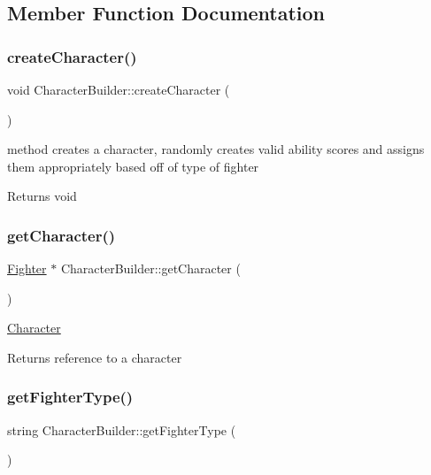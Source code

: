 \subsection{Member Function Documentation}
\hypertarget{class_character_builder_a3565d9c329c959aa340d7c0ebf30e613}{}\label{class_character_builder_a3565d9c329c959aa340d7c0ebf30e613} 
\subsubsection{\texorpdfstring{create\+Character()}{createCharacter()}}
{\footnotesize\ttfamily void Character\+Builder\+::create\+Character (\begin{DoxyParamCaption}{ }\end{DoxyParamCaption})}

method creates a character, randomly creates valid ability scores and assigns them appropriately based off of type of fighter \begin{DoxyReturn}{Returns}
void 
\end{DoxyReturn}
\hypertarget{class_character_builder_aef13e6e69fd2d07572daeb2643a3fa34}{}\label{class_character_builder_aef13e6e69fd2d07572daeb2643a3fa34} 
\subsubsection{\texorpdfstring{get\+Character()}{getCharacter()}}
{\footnotesize\ttfamily \hyperlink{class_fighter}{Fighter} $\ast$ Character\+Builder\+::get\+Character (\begin{DoxyParamCaption}{ }\end{DoxyParamCaption})}

\hyperlink{class_character}{Character} \begin{DoxyReturn}{Returns}
reference to a character 
\end{DoxyReturn}
\hypertarget{class_character_builder_ae7c1c4adb177df591db8ae2c9eae9cb9}{}\label{class_character_builder_ae7c1c4adb177df591db8ae2c9eae9cb9} 
\subsubsection{\texorpdfstring{get\+Fighter\+Type()}{getFighterType()}}
{\footnotesize\ttfamily string Character\+Builder\+::get\+Fighter\+Type (\begin{DoxyParamCaption}{ }\end{DoxyParamCaption})}

